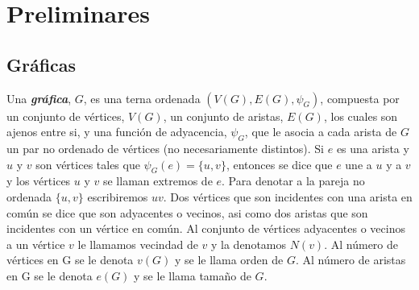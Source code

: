 \chapter{Preliminares}


\section{Gr\'aficas}

Una \textbf{\textit{gr\'afica}}, $G$, es una terna ordenada $(V(G),E(G), \psi_G)$, compuesta por un
conjunto de v\'ertices, $V(G)$, un conjunto de aristas, $E(G)$, los cuales son ajenos entre si, y una funci\'on de
adyacencia, $\psi_G$, que le asocia a cada arista de $G$ un par no ordenado de v\'ertices (no necesariamente
distintos). Si $e$ es una arista y $u$ y $v$ son v\'ertices tales que $\psi_G(e) = \{u,v\}$, entonces se dice que $e$
une a $u$ y a $v$ y los v\'ertices $u$ y $v$ se llaman extremos de $e$.
Para denotar a la pareja no ordenada $\{u,v\}$ escribiremos $uv$.
Dos v\'ertices que son incidentes con una arista en com\'un se dice que son adyacentes o vecinos, asi como dos
aristas que son incidentes con un v\'ertice en com\'un. Al conjunto de v\'ertices adyacentes o vecinos a un v\'ertice
$v$ le llamamos vecindad de $v$ y la denotamos $N(v)$.
Al n\'umero de v\'ertices en G se le denota $v(G)$ y se le llama orden de $G$.
Al n\'umero de aristas en G se le denota $e(G)$ y se le llama tama\~no de $G$.

